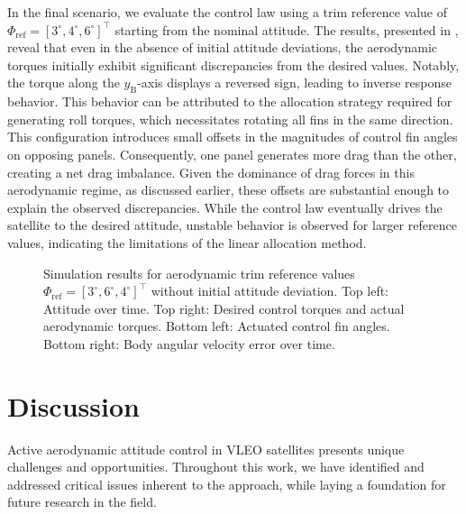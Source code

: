 \documentclass[pdflatex,sn-mathphys-num]{sn-jnl}%
\theoremstyle{thmstyleone}%
\theoremstyle{thmstyletwo}%
\theoremstyle{thmstylethree}%
\begin{document}
	In the final scenario, we evaluate the control law using a trim reference value of $\Phi_{\text{ref}} = [3^{\circ}, 4^{\circ}, 6^{\circ}]^{\top}$ starting from the nominal attitude. The results, presented in , reveal that even in the absence of initial attitude deviations, the aerodynamic torques initially exhibit significant discrepancies from the desired values. Notably, the torque along the $y_{\text{B}}$-axis displays a reversed sign, leading to inverse response behavior.
	This behavior can be attributed to the allocation strategy required for generating roll torques, which necessitates rotating all fins in the same direction. This configuration introduces small offsets in the magnitudes of control fin angles on opposing panels. Consequently, one panel generates more drag than the other, creating a net drag imbalance. Given the dominance of drag forces in this aerodynamic regime, as discussed earlier, these offsets are substantial enough to explain the observed discrepancies.
	While the control law eventually drives the satellite to the desired attitude, unstable behavior is observed for larger reference values, indicating the limitations of the linear allocation method.

	

    \begin{figure}[h]
		
		\caption{Simulation results for aerodynamic trim reference values $\Phi_{\text{ref}}=[3^{\circ}, 6^{\circ}, 4^{\circ}]^{\top}$ without initial attitude deviation. Top left: Attitude over time. Top right: Desired control torques and actual aerodynamic torques. Bottom left: Actuated control fin angles. Bottom right: Body angular velocity error over time.}
		\label{fig:trim_sim_results}
	\end{figure}

    \section{Discussion}
	\label{sec:discussion}
	Active aerodynamic attitude control in VLEO satellites presents unique challenges and opportunities. Throughout this work, we have identified and addressed critical issues inherent to the approach, while laying a foundation for future research in the field.
\end{document}
